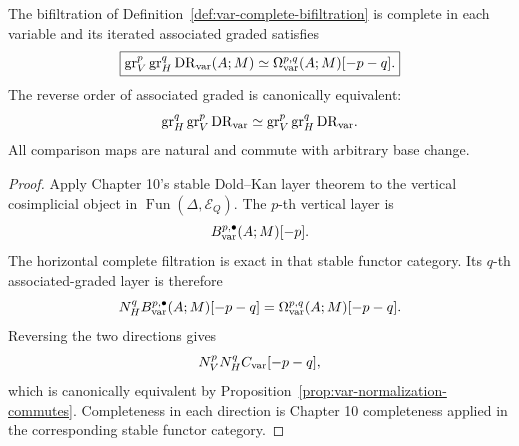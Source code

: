 \begin{theorem}
\label{thm:var-bifiltration-graded}
The bifiltration of Definition~\ref{def:var-complete-bifiltration} is complete in each variable and its iterated associated graded satisfies
\[
    \boxed{
    \operatorname{gr}_V^p\operatorname{gr}_H^q
    \mathrm{DR}_{\mathrm{var}}(A;M)
    \simeq
    \Omega_{\mathrm{var}}^{p,q}(A;M)[-p-q].
    }
\]
The reverse order of associated graded is canonically equivalent:
\[
    \operatorname{gr}_H^q\operatorname{gr}_V^p\mathrm{DR}_{\mathrm{var}}
    \simeq
    \operatorname{gr}_V^p\operatorname{gr}_H^q\mathrm{DR}_{\mathrm{var}}.
\]
All comparison maps are natural and commute with arbitrary base change.
\end{theorem}

\begin{proof}
Apply Chapter 10's stable Dold--Kan layer theorem to the vertical cosimplicial object in \(\operatorname{Fun}(\Delta,\mathcal E_Q)\). The \(p\)-th vertical layer is
\[
    B_{\mathrm{var}}^{p,\bullet}(A;M)[-p].
\]
The horizontal complete filtration is exact in that stable functor category. Its \(q\)-th associated-graded layer is therefore
\[
    N_H^qB_{\mathrm{var}}^{p,\bullet}(A;M)[-p-q]
    =
    \Omega_{\mathrm{var}}^{p,q}(A;M)[-p-q].
\]
Reversing the two directions gives
\[
    N_V^pN_H^qC_{\mathrm{var}}[-p-q],
\]
which is canonically equivalent by Proposition~\ref{prop:var-normalization-commutes}. Completeness in each direction is Chapter 10 completeness applied in the corresponding stable functor category.
\end{proof}


